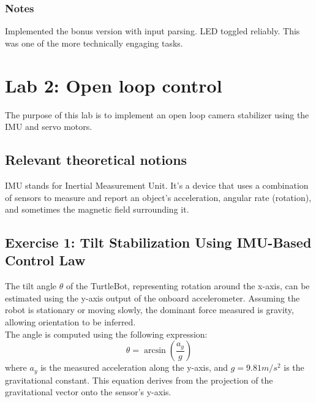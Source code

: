 \documentclass[english]{article}
\begin{document}
	\subsubsection{Notes}
	Implemented the bonus version with input parsing. LED toggled reliably. This was one of the more technically engaging tasks.	
	
	
	\section{Lab 2: Open loop control}
	The purpose of this lab is to implement an open loop camera stabilizer using the IMU and servo motors.\\
	\subsection{Relevant theoretical notions}
	IMU stands for Inertial Measurement Unit. It's a device that uses a combination of sensors to measure and report an object's acceleration, angular rate (rotation), and sometimes the magnetic field surrounding it.
	
	\subsection{Exercise 1: Tilt Stabilization Using IMU-Based Control Law}
	The tilt angle $\theta$ of the TurtleBot, representing rotation around the x-axis, can be estimated using the y-axis output of the onboard accelerometer. Assuming the robot is stationary or moving slowly, the dominant force measured is gravity, allowing orientation to be inferred.\\
	The angle is computed using the following expression:\\	
	 \begin{equation}
	 	\theta = \arcsin(\frac{a_y}{g})	 
	 \end{equation}
	 where $a_y$ is the measured acceleration along the y-axis, and $g=9.81m/s^2$ is the gravitational constant. This equation derives from the projection of the gravitational vector onto the sensor’s y-axis.
	 
\end{document}
